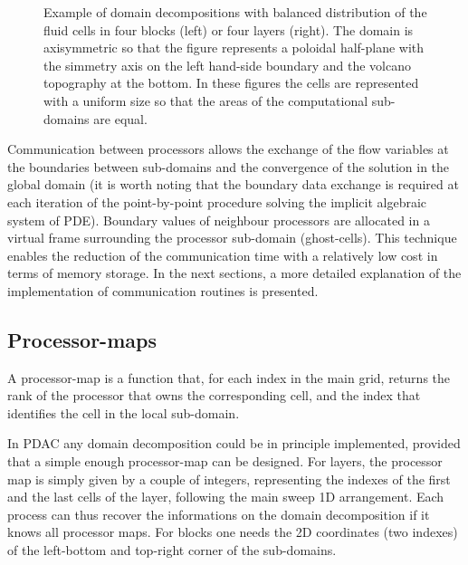 %
\begin{figure}[htb]
\setlength{\unitlength}{1mm}
\begin{center}
\begin{minipage}{6cm}
\centerline{}
\end{minipage}
\begin{minipage}{6cm}
\centerline{}
\end{minipage}
\end{center}
\caption{Example of domain decompositions with balanced distribution of
the fluid cells in four blocks (left) or four layers (right).
The domain is axisymmetric so that the figure represents a poloidal
half-plane with the simmetry axis on the left hand-side boundary and
the volcano topography at the bottom. In these figures the cells are represented
with a uniform size so that the areas of the computational sub-domains
are equal.\label{fig:Ves_part}}
\end{figure}
%

Communication between processors allows the exchange of the flow variables
at the boundaries between sub-domains and the convergence of the solution
in the global domain (it is worth noting that the
boundary data exchange is required at each iteration of the point-by-point
procedure solving the implicit algebraic system of PDE).
Boundary values of neighbour processors are allocated in a virtual
frame surrounding the processor sub-domain (ghost-cells). This technique
enables the reduction of the communication time with a relatively low cost
in terms of memory storage.
In the next sections, a more detailed explanation of the implementation of communication
routines is presented.
%
\subsection{Processor-maps}
A processor-map is a function that, for each index in the main grid, returns the rank
of the processor that owns the corresponding cell, and the index that identifies the
cell in the local sub-domain.

In PDAC any domain decomposition could be in principle implemented, provided that a 
simple enough processor-map can be designed.
For layers, the processor map is simply given by a couple of integers,
representing the indexes of the first and the last cells of the layer, following
the main sweep 1D arrangement.  Each process can thus recover
the informations on the domain decomposition if it knows all processor maps.
For blocks one needs the 2D coordinates (two indexes) of the left-bottom and
top-right corner of the sub-domains.


